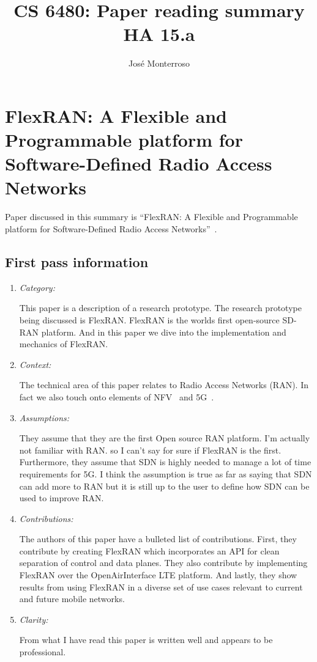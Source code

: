 \documentclass[letterpaper,twocolumn,10pt]{article}
\title{CS 6480: Paper reading summary\\
HA 15.a\\}
\author{José Monterroso}
\affil{School of Computing, University of Utah}
\begin{document}
\maketitle
\section{FlexRAN: A Flexible and Programmable platform for Software-Defined Radio Access Networks}

Paper discussed in this summary is ``FlexRAN: A Flexible and Programmable platform for Software-Defined Radio Access Networks''~\cite{flexran}.

\subsection{First pass information}
\label{sec:first}
\begin{enumerate}
\item {\it Category:}

This paper is a description of a research prototype. The research prototype being discussed is FlexRAN. FlexRAN is the 
worlds first open-source SD-RAN platform. And in this paper we dive into the implementation and mechanics of FlexRAN.

\item {\it Context:} 

The technical area of this paper relates to Radio Access Networks (RAN). In fact we also touch onto elements of NFV~\cite{nfv}
and 5G~\cite{5gwhite}. 

\item {\it Assumptions:} 

They assume that they are the first Open source RAN platform. I'm actually not familiar with RAN. so I can't say for sure
if FlexRAN is the first. Furthermore, they assume that SDN is highly needed to manage a lot of time requirements for 5G. 
I think the assumption is true as far as saying that SDN can add more to RAN but it is still up to the user to define how 
SDN can be used to improve RAN.

\item {\it Contributions:} 

The authors of this paper have a bulleted list of contributions. First, they contribute by creating FlexRAN which incorporates an
API for clean separation of control and data planes. They also contribute by implementing FlexRAN over the OpenAirInterface 
LTE platform. And lastly, they show results from using FlexRAN in a diverse set of use cases relevant to current and future mobile
networks. 

\item {\it Clarity:} 

From what I have read this paper is written well and appears to be professional.

\end{enumerate}
\end{document}
